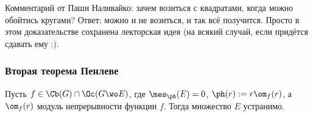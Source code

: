 \documentclass[a4paper]{article}
\begin{document}
\begin{petit}
Комментарий от Паши Наливайко: зачем возиться с квадратами, когда можно обойтись кругами?  Ответ: можно и не возиться,
и так всё получится. Просто в этом доказательстве сохранена лекторская идея (на всякий случай, если придётся сдавать ему :).
\end{petit}

\subsubsection{Вторая теорема Пенлеве}

\begin{theorem}[Е.\,П.\,Долженко]
Пусть $f\in \Cb(G) \cap \Oc(G\wo E)$, где $\mes_\ph(E)=0$, $\ph(r) := r\om_f(r)$, а $\om_f(r)$ модуль непрерывности
функции $f$. Тогда множество $E$ устранимо.
\end{theorem}
\end{document}
